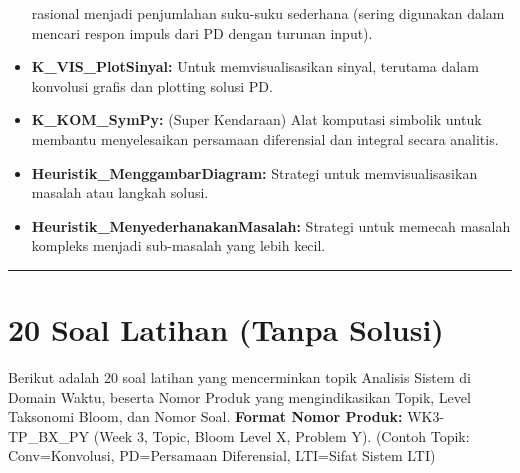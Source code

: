 \documentclass[
  letterpaper,
  DIV=11,
  numbers=noendperiod]{scrreprt}
\begin{document}
\begin{itemize}
  rasional menjadi penjumlahan suku-suku sederhana (sering digunakan
  dalam mencari respon impuls dari PD dengan turunan input).
\item
  \textbf{K\_VIS\_PlotSinyal:} Untuk memvisualisasikan sinyal, terutama
  dalam konvolusi grafis dan plotting solusi PD.
\item
  \textbf{K\_KOM\_SymPy:} (Super Kendaraan) Alat komputasi simbolik
  untuk membantu menyelesaikan persamaan diferensial dan integral secara
  analitis.
\item
  \textbf{Heuristik\_MenggambarDiagram:} Strategi untuk
  memvisualisasikan masalah atau langkah solusi.
\item
  \textbf{Heuristik\_MenyederhanakanMasalah:} Strategi untuk memecah
  masalah kompleks menjadi sub-masalah yang lebih kecil.
\end{itemize}

\begin{center}\rule{0.5\linewidth}{0.5pt}\end{center}


\chapter{20 Soal Latihan (Tanpa
Solusi)}\label{soal-latihan-tanpa-solusi}

Berikut adalah 20 soal latihan yang mencerminkan topik Analisis Sistem
di Domain Waktu, beserta Nomor Produk yang mengindikasikan Topik, Level
Taksonomi Bloom, dan Nomor Soal. \textbf{Format Nomor Produk:}
WK3-TP\_BX\_PY (Week 3, Topic, Bloom Level X, Problem Y). (Contoh Topik:
Conv=Konvolusi, PD=Persamaan Diferensial, LTI=Sifat Sistem LTI)
\end{document}
